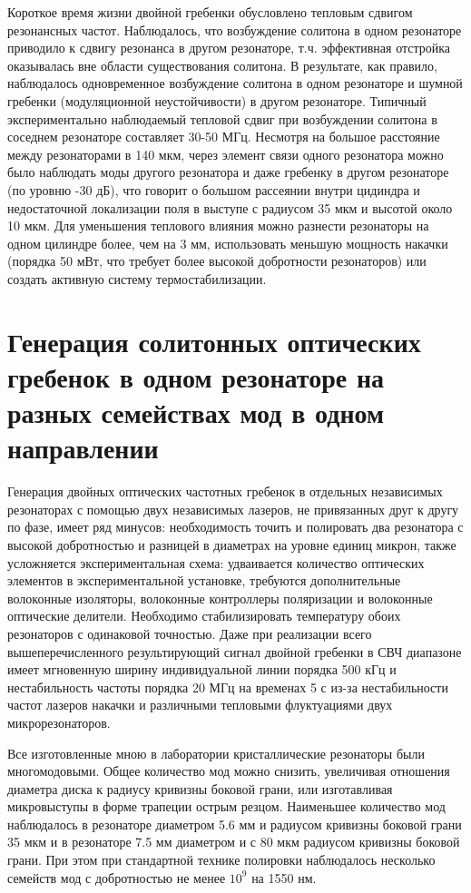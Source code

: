 Короткое время жизни двойной гребенки обусловлено тепловым сдвигом резонансных частот. Наблюдалось, что возбуждение солитона в одном резонаторе приводило к сдвигу резонанса в другом резонаторе, т.ч. эффективная отстройка оказывалась вне области существования солитона. В результате, как правило, наблюдалось одновременное возбуждение солитона в одном резонаторе и шумной гребенки (модуляционной неустойчивости) в другом резонаторе. Типичный экспериментально наблюдаемый тепловой сдвиг при возбуждении солитона в соседнем резонаторе составляет 30-50 МГц. Несмотря на большое расстояние между резонаторами в 140 мкм, через элемент связи одного резонатора можно было наблюдать моды другого резонатора и даже гребенку в другом резонаторе (по уровню -30 дБ), что говорит о большом рассеянии внутри цидиндра и недостаточной локализации поля в выступе с радиусом 35 мкм и высотой около 10 мкм. Для уменьшения теплового влияния можно разнести резонаторы на одном цилиндре более, чем на 3 мм, использовать меньшую мощность накачки (порядка 50 мВт, что требует более высокой добротности резонаторов) или создать активную систему термостабилизации.

\section{Генерация солитонных оптических гребенок в одном резонаторе на разных семействах мод в одном направлении}

Генерация двойных оптических частотных гребенок в отдельных независимых резонаторах с помощью двух независимых лазеров, не привязанных друг к другу по фазе, имеет ряд минусов: необходимость точить и полировать два резонатора с высокой добротностью и разницей в диаметрах на уровне единиц микрон, также усложняется экспериментальная схема: удваивается количество оптических элементов в экспериментальной установке, требуются дополнительные волоконные изоляторы, волоконные контроллеры поляризации и волоконные оптические делители. Необходимо стабилизировать температуру обоих резонаторов с одинаковой точностью. Даже при реализации всего вышеперечисленного результирующий сигнал двойной гребенки в СВЧ диапазоне имеет мгновенную ширину индивидуальной линии порядка 500 кГц и нестабильность частоты порядка 20 МГц на временах 5 с из-за нестабильности частот лазеров накачки и различными тепловыми флуктуациями двух микрорезонаторов.

Все изготовленные мною в лаборатории кристаллические резонаторы были многомодовыми. Общее количество мод можно снизить, увеличивая отношения диаметра диска к радиусу кривизны боковой грани, или изготавливая микровыступы в форме трапеции острым резцом. Наименьшее количество мод наблюдалось в резонаторе диаметром 5.6 мм и радиусом кривизны боковой грани 35 мкм и в резонаторе 7.5 мм диаметром и с 80 мкм радиусом кривизны боковой грани. При этом при стандартной технике полировки наблюдалось несколько семейств мод с добротностью не менее $10^9$ на 1550 нм.

